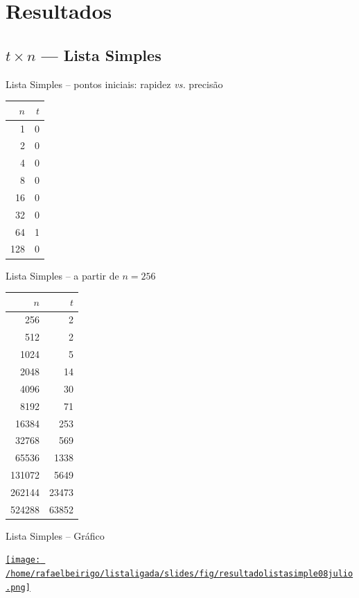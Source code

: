 \documentclass[bigger]{beamer}
\begin{document}
\section{Resultados}
\label{sec-3}
\subsection{$t \times n$ --- Lista Simples}
\label{sec-3-1}
\begin{frame}[label=sec-3-1-1]{Lista Simples -- pontos iniciais: rapidez \emph{vs.} precisão}
\begin{center}
\begin{tabular}{rr}
$n$ & $t$\\
\hline
1 & 0\\
2 & 0\\
4 & 0\\
8 & 0\\
16 & 0\\
32 & 0\\
64 & 1\\
128 & 0\\
\end{tabular}
\end{center}
\end{frame}
\begin{frame}[label=sec-3-1-2]{Lista Simples -- a partir de $n = 256$}
\begin{center}
\begin{tabular}{rr}
$n$ & $t$\\
\hline
256 & 2\\
512 & 2\\
1024 & 5\\
2048 & 14\\
4096 & 30\\
8192 & 71\\
16384 & 253\\
32768 & 569\\
65536 & 1338\\
131072 & 5649\\
262144 & 23473\\
524288 & 63852\\
\end{tabular}
\end{center}
\end{frame}
\begin{frame}[label=sec-3-1-3]{Lista Simples -- Gráfico}
\begin{center}
\href{fig/resultadolistasimple08julio.png}{\texttt{[image: /home/rafaelbeirigo/listaligada/slides/fig/resultadolistasimple08julio.png]}}
\end{center}
\end{frame}
\end{document}
